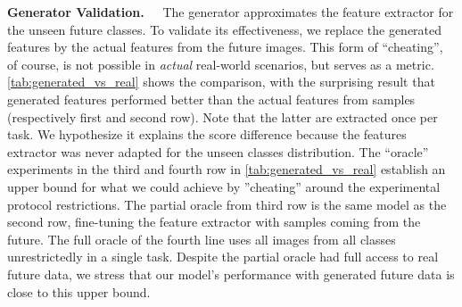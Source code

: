 

\textbf{Generator Validation.~~} The generator approximates the feature extractor for the unseen
future classes. To validate its effectiveness, we replace the generated features by the actual
features from the future images. This form of “cheating”, of course, is not possible in
\textit{actual} real-world scenarios, but serves as a metric. \autoref{tab:generated_vs_real} shows
the comparison, with the surprising result that generated features performed better than the actual
features from samples (respectively first and second row). Note that the latter are extracted once
per task. We hypothesize it explains the score difference because the features extractor was never
adapted for the unseen classes distribution. The “oracle” experiments in the third and fourth row in
\autoref{tab:generated_vs_real} establish an upper bound for what we could achieve by ”cheating”
around the experimental protocol restrictions. The partial oracle from third row is the same model
as the second row, fine-tuning the feature extractor with samples coming from the future. The full
oracle of the fourth line uses all images from all classes unrestrictedly in a single task. Despite
the partial oracle had full access to real future data, we stress that our model's performance with
generated future data is close to this upper bound.



% 

